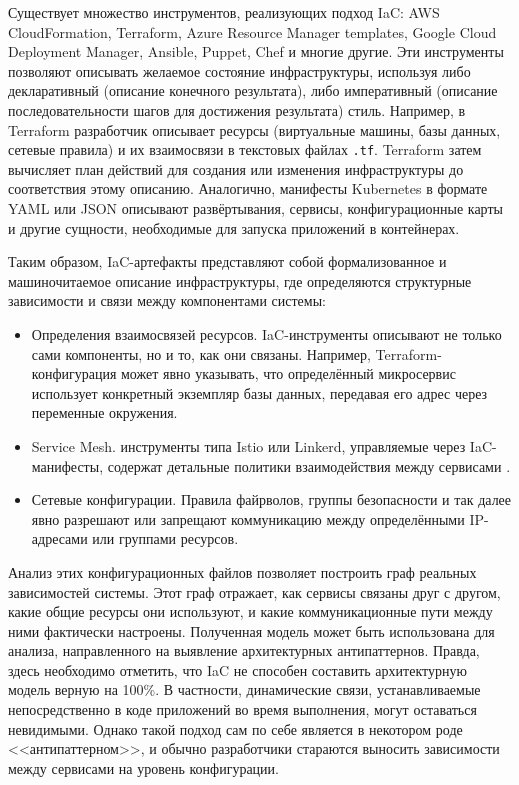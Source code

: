 Существует множество инструментов, реализующих подход IaC: AWS CloudFormation, Terraform, Azure Resource Manager templates, Google Cloud Deployment Manager, Ansible, Puppet, Chef и многие другие. Эти инструменты позволяют описывать желаемое состояние инфраструктуры, используя либо декларативный (описание конечного результата), либо императивный (описание последовательности шагов для достижения результата) стиль. Например, в Terraform разработчик описывает ресурсы (виртуальные машины, базы данных, сетевые правила) и их взаимосвязи в текстовых файлах \verb|.tf|. Terraform затем вычисляет план действий для создания или изменения инфраструктуры до соответствия этому описанию. Аналогично, манифесты Kubernetes в формате YAML или JSON описывают развёртывания, сервисы, конфигурационные карты и другие сущности, необходимые для запуска приложений в контейнерах.

Таким образом, IaC-артефакты представляют собой формализованное и машиночитаемое описание инфраструктуры, где определяются структурные зависимости и связи между компонентами системы:

\begin{itemize}
    \item Определения взаимосвязей ресурсов. IaC-инструменты описывают не только сами компоненты, но и то, как они связаны. Например, Terraform-конфигурация может явно указывать, что определённый микросервис использует конкретный экземпляр базы данных, передавая его адрес через переменные окружения.
    \item Service Mesh. инструменты типа Istio или Linkerd, управляемые через IaC-манифесты, содержат детальные политики взаимодействия между сервисами \cite{istio-mesh}.
    \item Сетевые конфигурации. Правила файрволов, группы безопасности и так далее явно разрешают или запрещают коммуникацию между определёнными IP-адресами или группами ресурсов.
\end{itemize}

Анализ этих конфигурационных файлов позволяет построить граф реальных зависимостей системы. Этот граф отражает, как сервисы связаны друг с другом, какие общие ресурсы они используют, и какие коммуникационные пути между ними фактически настроены. Полученная модель может быть использована для анализа, направленного на выявление архитектурных антипаттернов. Правда, здесь необходимо отметить, что IaC не способен составить архитектурную модель верную на 100\%. В частности, динамические связи, устанавливаемые непосредственно в коде приложений во время выполнения, могут оставаться невидимыми. Однако такой подход сам по себе является в некотором роде <<антипаттерном>>, и обычно разработчики стараются выносить зависимости между сервисами на уровень конфигурации.

